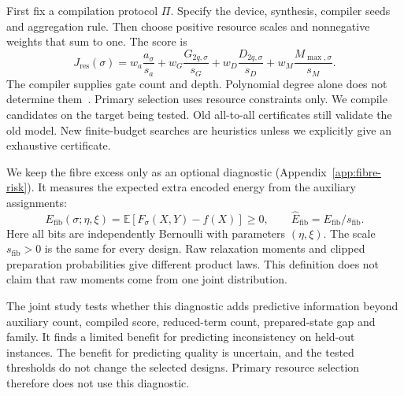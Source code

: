 \documentclass[a4paper,onecolumn,11pt,unpublished]{quantumarticle}
\theoremstyle{remark}
\begin{document}
First fix a compilation protocol $\Pi$. Specify the device, synthesis,
compiler seeds and aggregation rule. Then choose positive resource scales
and nonnegative weights that sum to one. The score is
\begin{equation}
J_{\mathrm{res}}(\sigma)=
w_a\frac{a_\sigma}{s_a}+w_G\frac{G_{2q,\sigma}}{s_G}
+w_D\frac{D_{2q,\sigma}}{s_D}+w_M\frac{M_{\max,\sigma}}{s_M}.
\label{eq:Jres}
\end{equation}
The compiler supplies gate count and depth. Polynomial degree alone does
not determine them~\cite{Verchere2023,Weidenfeller2022,Schmidbauer2024}.
Primary selection uses resource constraints only.
We compile candidates on the target being tested.
Old all-to-all certificates still validate the old model.
New finite-budget searches are heuristics unless we explicitly give an
exhaustive certificate.

We keep the fibre excess only as an optional diagnostic
(Appendix~\ref{app:fibre-risk}). It measures the expected extra encoded
energy from the auxiliary assignments:
\begin{equation}
E_{\mathrm{fib}}(\sigma;\eta,\xi)=\mathbb E[F_\sigma(X,Y)-f(X)]\geq0,
\qquad \widehat E_{\mathrm{fib}}=E_{\mathrm{fib}}/s_{\mathrm{fib}}.
\label{eq:fibre-excess-short}
\end{equation}
Here all bits are independently Bernoulli with parameters $(\eta,\xi)$.
The scale $s_{\mathrm{fib}}>0$ is the same for every design.
Raw relaxation moments and clipped preparation probabilities give different
product laws. This definition does not claim that raw moments come from
one joint distribution.

The joint study tests whether this diagnostic adds predictive information
beyond auxiliary count, compiled score, reduced-term count, prepared-state
gap and family. It finds a limited benefit for predicting inconsistency
on held-out instances. The benefit for predicting quality is uncertain,
and the tested thresholds do not change the selected designs. Primary
resource selection therefore does not use this diagnostic.
\end{document}
